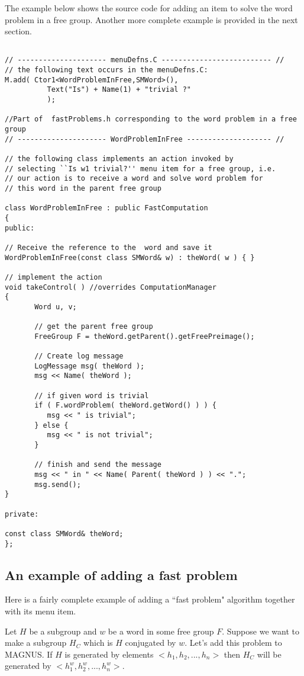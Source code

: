 \documentclass[12pt]{article}
\def\nsmagnus{MAGNUS}
\begin{document}
The example below shows the source code for adding an item
to solve the word problem in a free group.  Another more complete example is
provided in the next section.

\footnotesize
\begin{verbatim}

// --------------------- menuDefns.C -------------------------- //
// the following text occurs in the menuDefns.C:
M.add( Ctor1<WordProblemInFree,SMWord>(),
          Text("Is") + Name(1) + "trivial ?"
          );

//Part of  fastProblems.h corresponding to the word problem in a free group
// --------------------- WordProblemInFree -------------------- //

// the following class implements an action invoked by
// selecting ``Is w1 trivial?'' menu item for a free group, i.e.
// our action is to receive a word and solve word problem for
// this word in the parent free group

class WordProblemInFree : public FastComputation
{
public:

// Receive the reference to the  word and save it
WordProblemInFree(const class SMWord& w) : theWord( w ) { }

// implement the action
void takeControl( ) //overrides ComputationManager
{
       Word u, v;

       // get the parent free group
       FreeGroup F = theWord.getParent().getFreePreimage();

       // Create log message
       LogMessage msg( theWord );
       msg << Name( theWord );

       // if given word is trivial
       if ( F.wordProblem( theWord.getWord() ) ) {
          msg << " is trivial";
       } else {
          msg << " is not trivial";
       }

       // finish and send the message
       msg << " in " << Name( Parent( theWord ) ) << ".";
       msg.send();
}

private:

const class SMWord& theWord;
};
\end{verbatim}
\normalsize

\subsection{An example of adding a fast problem} Here is a fairly
complete example of adding a ``fast problem" algorithm together with
its menu item.

Let $H$ be a subgroup and $w$ be a word in some free group $F$.
Suppose we want to make a subgroup $H_C$ which is $H$ conjugated by $w$.
Let's add this problem to \nsmagnus. If $H$ is generated by elements
$<h_1, h_2, ..., h_n>$ then $H_C$ will be generated by $<h_1^w,
h_2^w, ..., h_n^w>$.
\end{document}
